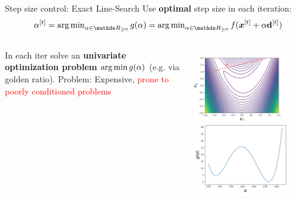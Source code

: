 \documentclass[11pt,compress,t,notes=noshow, xcolor=table]{beamer}
\begin{document}
	\begin{vbframe}{Step size control: Exact Line-Search}
		Use \textbf{optimal} step size in each iteration:
		\vspace*{-0.1cm}
		$$ \alpha^{[t]} = \argmin_{\alpha \in \R_{\ge 0}} g(\alpha) = \argmin_{\alpha \in \R_{\ge 0}} f(\bm{x}^{[t]} + \alpha \mathbf{d}^{[t]})$$
		\begin{columns}
			\begin{column}{0.48\textwidth}
				
				\vspace*{-0.2cm}
				In each iter solve an \textbf{univariate optimization problem} $\operatorname{arg\,min} g(\alpha)$ (e.g. via golden ratio). Problem: Expensive, \textcolor{red}{prone to poorly conditioned problems}
			\end{column}
			\begin{column}{0.48\textwidth}
				\vspace*{-1cm}
				\begin{center}
					\includegraphics[width = 0.8\textwidth]{figure_man/line_search_rosenbrock.png} \\
					\includegraphics[width = 0.8\textwidth]{figure_man/line_search_rosenbrock_alpha.png}
				\end{center}
			\end{column}
		\end{columns}
	\end{vbframe}
	
\end{document}
